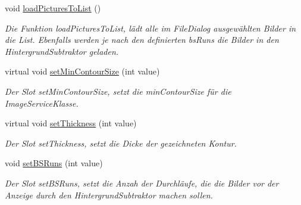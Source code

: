 \begin{DoxyCompactItemize}
\item 
\hypertarget{class_dead_form_a56f06b6d77bd783d885c986017fff5ce}{}void \hyperlink{class_dead_form_a56f06b6d77bd783d885c986017fff5ce}{load\+Pictures\+To\+List} ()\label{class_dead_form_a56f06b6d77bd783d885c986017fff5ce}

\begin{DoxyCompactList}\small\item\em Die Funktion load\+Pictures\+To\+List, lädt alle im File\+Dialog ausgewählten Bilder in die List. Ebenfalls werden je nach den definierten bs\+Runs die Bilder in den Hintergrund\+Subtraktor geladen. \end{DoxyCompactList}\item 
\hypertarget{class_dead_form_a6df3ece956302dc4a95c0e720825758f}{}virtual void \hyperlink{class_dead_form_a6df3ece956302dc4a95c0e720825758f}{set\+Min\+Contour\+Size} (int value)\label{class_dead_form_a6df3ece956302dc4a95c0e720825758f}

\begin{DoxyCompactList}\small\item\em Der Slot set\+Min\+Contour\+Size, setzt die min\+Contour\+Size für die Image\+Service\+Klasse. \end{DoxyCompactList}\item 
\hypertarget{class_dead_form_aeae247600bc30ae81e69c047ae45d8cf}{}virtual void \hyperlink{class_dead_form_aeae247600bc30ae81e69c047ae45d8cf}{set\+Thickness} (int value)\label{class_dead_form_aeae247600bc30ae81e69c047ae45d8cf}

\begin{DoxyCompactList}\small\item\em Der Slot set\+Thickness, setzt die Dicke der gezeichneten Kontur. \end{DoxyCompactList}\item 
\hypertarget{class_dead_form_aef03bdf9bc1e7d0bf8bcf6716e0715ef}{}void \hyperlink{class_dead_form_aef03bdf9bc1e7d0bf8bcf6716e0715ef}{set\+B\+S\+Runs} (int value)\label{class_dead_form_aef03bdf9bc1e7d0bf8bcf6716e0715ef}

\begin{DoxyCompactList}\small\item\em Der Slot set\+B\+S\+Runs, setzt die Anzah der Durchläufe, die die Bilder vor der Anzeige durch den Hintergrund\+Subtraktor machen sollen. \end{DoxyCompactList}\end{DoxyCompactItemize}
